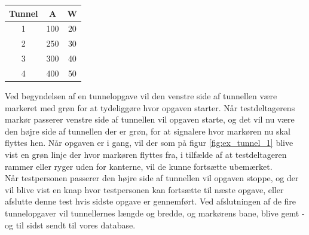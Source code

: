\begin{center}
	\begin{tabular}{c c c}
		Tunnel & A & W \\
		\hline
		1 & 100 & 20 \\
		2 & 250 & 30 \\
		3 & 300 & 40 \\
		4 & 400 & 50 \\
	\end{tabular}
	\label{tab:tunnelopgave}
\end{center}
Ved begyndelsen af en tunnelopgave vil den venstre side af tunnellen være markeret med grøn for at tydeliggøre hvor opgaven starter. Når testdeltagerens markør passerer venstre side af tunnellen vil opgaven starte, og det vil nu være den højre side af tunnellen der er grøn, for at signalere hvor markøren nu skal flyttes hen. Når opgaven er i gang, vil der som på figur \ref{fig:ex_tunnel_1} blive vist en grøn linje der hvor markøren flyttes fra, i tilfælde af at testdeltageren rammer eller ryger uden for kanterne, vil de kunne fortsætte ubemærket.\\
Når testpersonen passerer den højre side af tunnellen vil opgaven stoppe, og der vil blive vist en knap hvor testpersonen kan fortsætte til næste opgave, eller afslutte denne test hvis sidste opgave er gennemført. Ved afslutningen af de fire tunnelopgaver vil tunnellernes længde og bredde, og markørens bane, blive gemt - og til sidst sendt til vores database.

